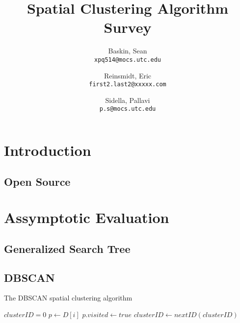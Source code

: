 \documentclass{article}
\author{
  Baskin, Sean\\
  \texttt{xpq514@mocs.utc.edu}
  \and
  Reinsmidt, Eric\\
  \texttt{first2.last2@xxxxx.com}
  \and
  Sidella, Pallavi\\
  \texttt{p.s@mocs.utc.edu}
}
\title{Spatial Clustering Algorithm Survey}
\begin{document}
\maketitle

\section{Introduction}

\subsection{Open Source}

\section{Assymptotic Evaluation}

\subsection{Generalized Search Tree}

\subsection{DBSCAN}

\begin{algorithm}
\caption{The DBSCAN spatial clustering algorithm}
\begin{algorithmic}[1]
	\State $clusterID = 0$
      \State $p \gets D[i]$
      \State $p.visited \gets true$    
          \State $clusterID \gets nextID(clusterID)$
        \EndIf
      \EndIf
	\EndFor
\EndProcedure
\Statex
{}
\EndProcedure
\end{algorithmic}
\end{algorithm}
\end{document}
